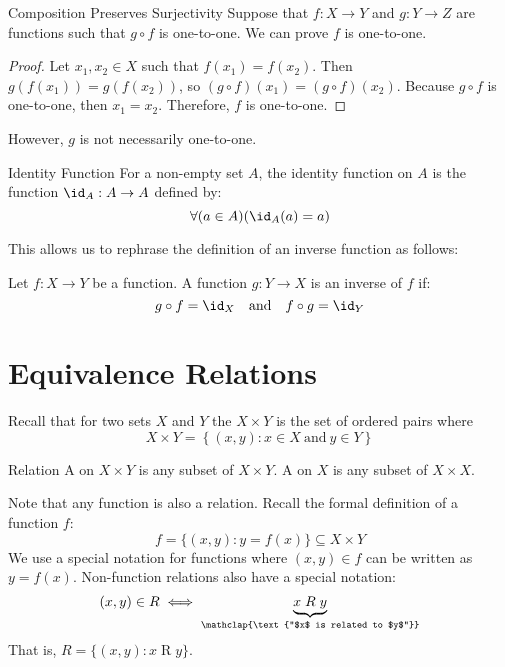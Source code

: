 \documentclass[letterpaper,12pt]{report}
\begin{document}
\begin{exbox}{Composition Preserves Surjectivity}{}
    Suppose that $f : X \to Y$ and $g : Y \to Z$ are functions such that $g \circ f$ is one-to-one.
    \tcblower
    We can prove $f$ is one-to-one.
    \begin{proof}
        Let $x_1, x_2 \in X$ such that $f(x_1) = f(x_2)$. Then $g(f(x_1)) = g(f(x_2))$, so $(g \circ f)(x_1) = (g \circ f)(x_2)$. Because $g \circ f$ is one-to-one, then $x_1 = x_2$. Therefore, $f$ is one-to-one.
    \end{proof}

    However, $g$ is not necessarily one-to-one.
\end{exbox}

\begin{dfnbox}{Identity Function}{}
    For a non-empty set $A$, the identity function on $A$ is the function $\id_A : A \to A$ defined by:
    \[ \forall (a \in A) ( \id_A(a) = a ) \]
\end{dfnbox}

This allows us to rephrase the definition of an inverse function as follows:

Let $f : X \to Y$ be a function. A function $g : Y \to X$ is an inverse of $f$ if:
\[ g \circ f = \id_X \quad \text{and} \quad f \circ g = \id_Y \]

\section{Equivalence Relations}

Recall that for two sets $X$ and $Y$ the  $X \times Y$ is the set of ordered pairs where
\[ X \times Y = \left\{ (x,y) : x \in X\ \text{and}\ y \in Y \right\} \]

\begin{dfnbox}{Relation}{}
    A  on $X \times Y$ is any subset of $X \times Y$.
    \tcblower
    A  on $X$ is any subset of $X \times X$.
\end{dfnbox}

Note that any function is also a relation. Recall the formal definition of a function $f$:
\[ f = \{ (x,y) : y = f(x) \} \subseteq X \times Y \]
We use a special notation for functions where $(x,y) \in f$ can be written as $y = f(x)$. Non-function relations also have a special notation:
\[ (x,y) \in R  \iff \underbrace{x \mathrel{R} y}_{\mathclap{\text{``$x$ is related to $y$''}}} \]
That is, $R = \{ (x, y) : x \mathrel{R} y \}$.
\end{document}
